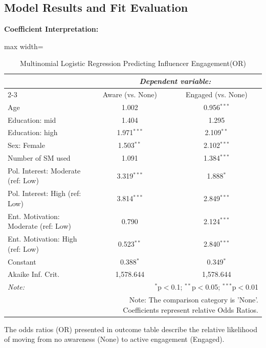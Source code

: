 \documentclass[12pt, a4paper]{article}
\begin{document}
	
	
	\subsection{Model Results and Fit Evaluation}
	\textbf{Coefficient Interpretation:}
	
	\begin{table}[H] \centering 
		\caption{Multinomial Logistic Regression Predicting Influencer Engagement(OR)} 
		\label{tab:multi_model} 
		\begin{adjustbox}{max width=\textwidth}
			\begin{tabular}{@{\extracolsep{5pt}}lcc} 
				\toprule
				& \multicolumn{2}{c}{\textit{Dependent variable:}} \\ 
				\cmidrule{2-3} 
				& Aware (vs. None) & Engaged (vs. None) \\ 
				\midrule
				Age & 1.002 & 0.956$^{***}$ \\ 
				Education: mid & 1.404 & 1.295 \\ 
				Education: high & 1.971$^{***}$ & 2.109$^{**}$ \\ 
				Sex: Female & 1.503$^{**}$ & 2.102$^{***}$ \\ 
				Number of SM used & 1.091 & 1.384$^{***}$ \\ 
				Pol. Interest: Moderate (ref: Low) & 3.319$^{***}$ & 1.888$^{*}$ \\ 
				Pol. Interest: High (ref: Low) & 3.814$^{***}$ & 2.849$^{***}$ \\ 
				Ent. Motivation: Moderate (ref: Low) & 0.790 & 2.124$^{***}$ \\ 
				Ent. Motivation: High (ref: Low) & 0.523$^{**}$ & 2.840$^{***}$ \\ 
				Constant & 0.388$^{*}$ & 0.349$^{*}$ \\ 
				\midrule
				Akaike Inf. Crit. & 1,578.644 & 1,578.644 \\ 
				\bottomrule
				\textit{Note:} & \multicolumn{2}{r}{$^{*}$p$<$0.1; $^{**}$p$<$0.05; $^{***}$p$<$0.01} \\ 
				& \multicolumn{2}{r}{Note: The comparison category is 'None'. Coefficients represent relative Odds Ratios.} \\ 
			\end{tabular}
		\end{adjustbox}
	\end{table} 
	
	The odds ratios (OR) presented in outcome table describe the relative likelihood of moving from no awareness (None) to active engagement (Engaged).
	
\end{document}
